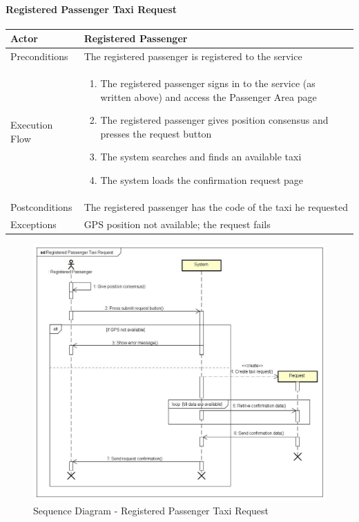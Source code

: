 \paragraph{Registered Passenger Taxi Request}
\begin{center}
	\begin{tabular}{ | l | p{8cm} |}
		\hline
		Actor &  Registered Passenger	\\ \hline
		Preconditions & The registered passenger is registered to the service	\\ \hline
		Execution Flow & \begin{enumerate}
			\item The registered passenger signs in to the service (as written above) and access the Passenger Area page
			\item The registered passenger gives position consensus and presses the request button
			\item The system searches and finds an available taxi
			\item The system loads the confirmation request page
		\end{enumerate}		\\ \hline
		Postconditions & The registered passenger has the code of the taxi he requested	\\ \hline
		Exceptions & GPS position not available; the request fails \\ \hline
	\end{tabular}
\end{center}
\newpage
\begin{landscape}
\begin{figure}[!h]
	\begin{center}			
		\includegraphics[height=\textheight]{../SE2_SD/RegisteredPassengerTaxiRequest}
		\caption{Sequence Diagram - Registered Passenger Taxi Request}	
	\end{center}
\end{figure}
\end{landscape}
\newpage
